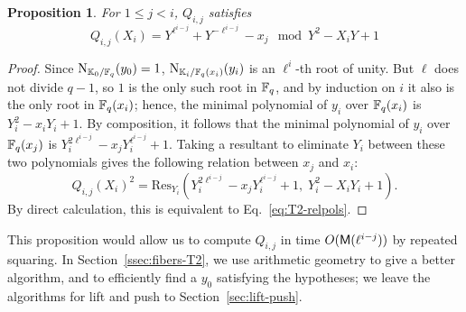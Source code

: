 \documentclass{sig-alternate}
\newtheorem{proposition}[definition]{Proposition}
\begin{document}
\begin{proposition}
  \label{th:T2-resultant}
  For $1 \le j < i$, $Q_{i,j}$ satisfies
  \begin{equation}
    \label{eq:T2-relpols}
    Q_{i,j}(X_i) = Y^{\ell^{i-j}} + Y^{-\ell^{i-j}} - x_j \mod Y^2-X_iY+1
  \end{equation}
\end{proposition}
\begin{proof}
  Since $\operatorname{N}_{\mathbb{K}_0/\mathbb{F}_q}(y_0)=1$, $\operatorname{N}_{\mathbb{K}_i/\mathbb{F}_q(x_i)}(y_i)$ is
  an $\ell^i$-th root of unity. But $\ell$ does not divide $q-1$, so
  $1$ is the only such root in $\mathbb{F}_q$, and by induction on $i$ it also
  is the only root in $\mathbb{F}_q(x_i)$; hence, the minimal polynomial of
  $y_i$ over $\mathbb{F}_q(x_i)$ is $Y_i^2 -x_i Y_i +1$. By composition, it
  follows that the minimal polynomial of $y_i$ over $\mathbb{F}_q(x_{j})$ is
  $Y_i^{2\ell^{i-j}}-x_{j} Y_i^{\ell^{i-j}}+1$. Taking a resultant to
  eliminate $Y_i$
  between these two polynomials gives the following relation between
  $x_{j}$ and $x_i$:
  \begin{equation*}
    Q_{i,j}(X_i)^2 = \mathrm{Res}_{Y_i}(Y_i^{2\ell^{i-j}}-x_{j}Y_i^{\ell^{i-j}}+1,\; Y_i^2-X_i Y_i+1).
  \end{equation*}
  By direct calculation, this is equivalent to
  Eq.~\eqref{eq:T2-relpols}.
\end{proof}

This proposition would allow us to compute $Q_{i,j}$ in time
$O(\mathsf{M}(\ell^{i-j}))$ by repeated squaring. In
Section~\ref{ssec:fibers-T2}, we use arithmetic geometry to give a
better algorithm, and to efficiently find a $y_0$ satisfying the
hypotheses; we leave the algorithms for lift and push to
Section~\ref{sec:lift-push}.
\end{document}
